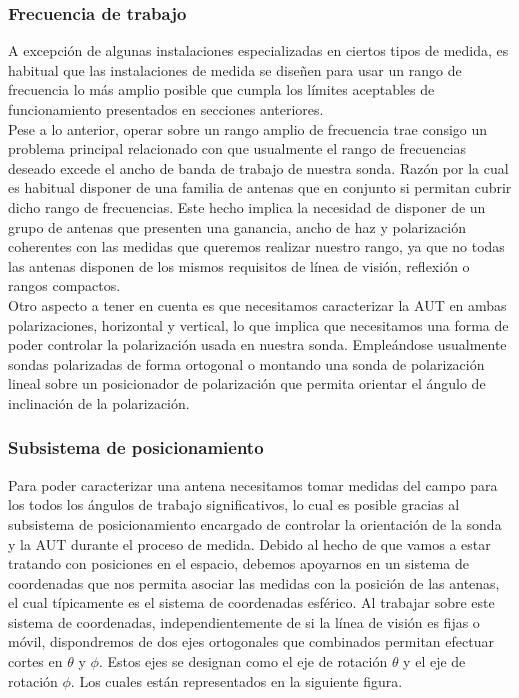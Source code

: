 \subsubsection{Frecuencia de trabajo}

A excepción de algunas instalaciones especializadas en ciertos tipos de medida, es habitual que las instalaciones de medida se diseñen para usar un rango de frecuencia lo más amplio posible que cumpla los límites aceptables de funcionamiento presentados en secciones anteriores.\\

Pese a lo anterior, operar sobre un rango amplio de frecuencia trae consigo un problema principal relacionado con que usualmente el rango de frecuencias deseado excede el ancho de banda de trabajo de nuestra sonda. Razón por la cual es habitual disponer de una familia de antenas que en conjunto si permitan cubrir dicho rango de frecuencias. Este hecho implica la necesidad de disponer de un grupo de antenas que presenten una ganancia, ancho de haz y polarización coherentes con las medidas que queremos realizar nuestro rango, ya que no todas las antenas disponen de los mismos requisitos de línea de visión, reflexión o rangos compactos.\\

Otro aspecto a tener en cuenta es que necesitamos caracterizar la AUT en ambas polarizaciones, horizontal y vertical, lo que implica que necesitamos una forma de poder controlar la polarización usada en nuestra sonda. Empleándose usualmente sondas polarizadas de forma ortogonal o montando una sonda de polarización lineal sobre un posicionador de polarización que permita orientar el ángulo de inclinación de la polarización.


\subsubsection{Subsistema de posicionamiento} 

Para poder caracterizar una antena necesitamos tomar medidas del campo para los todos los ángulos de trabajo significativos, lo cual es posible gracias al subsistema de posicionamiento encargado de controlar la orientación de la sonda y la AUT durante el proceso de medida. Debido al hecho de que vamos a estar tratando con posiciones en el espacio, debemos apoyarnos en un sistema de coordenadas que nos permita asociar las medidas con la posición de las antenas, el cual típicamente es el sistema de coordenadas esférico. Al trabajar sobre este sistema de coordenadas, independientemente de si la línea de visión es fijas o móvil, dispondremos de dos ejes ortogonales que combinados permitan efectuar cortes en $\theta$ y $\phi$. Estos ejes se designan como el eje de rotación $\theta$ y el eje de rotación $\phi$. Los cuales están representados en la siguiente figura. 


